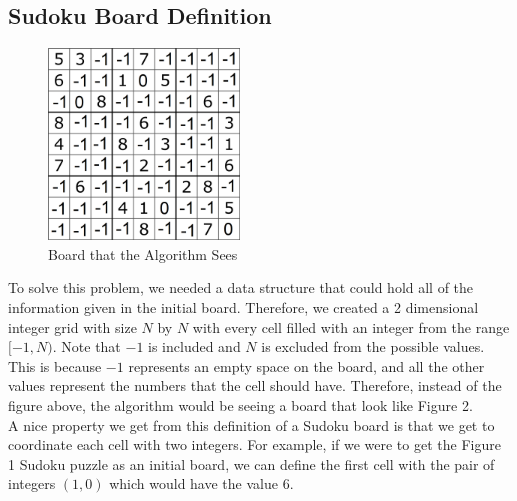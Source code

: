 \documentclass[12pt, a4paper]{article}
\begin{document}
		\subsection{Sudoku Board Definition}
			\begin{figure}
				\begin{center}
					\centerline{\includegraphics[width=2in]{sample_9_by_9_negative.png}}
				\end{center}
				\caption{Board that the Algorithm Sees}
			\end{figure}
			To solve this problem, we needed a data structure that could hold all of the information given in the initial board. Therefore, we created a 2 dimensional integer grid with size $N$ by $N$ with every cell filled with an integer from the range $[-1, N)$. Note that $-1$ is included and $N$ is excluded from the possible values. This is because $-1$ represents an empty space on the board, and all the other values represent the numbers that the cell should have. Therefore, instead of the figure above, the algorithm would be seeing a board that look like Figure 2.\\
			A nice property we get from this definition of a Sudoku board is that we get to coordinate each cell with two integers. For example, if we were to get the Figure 1 Sudoku puzzle as an initial board, we can define the first cell with the pair of integers $(1, 0)$ which would have the value $6$.
\end{document}
